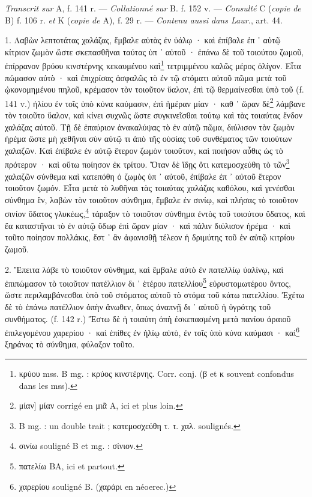 \documentclass[a4paper, 11pt, oneside, polutonikogreek, french]{article}
\begin{document}
\emph{Transcrit sur} A, f. 141 r. --- \emph{Collationné sur} B. f. 152 v. --- \emph{Consulté} C (\emph{copie de} B) f. 106 r. \emph{et} K (\emph{copie de} A), f. 29 r. --- \emph{Contenu aussi dans Laur.}, art. 44.

\bigskip

1. Λαβὼν λεπτοτάτας χαλάζας, ἔμβαλε αὐτὰς ἐν ὑάλῳ · καὶ ἐπίβαλε ἐπ ᾽ αὐτῷ κίτριον ζωμὸν ὥστε σκεπασθῆναι ταύτας ὐπ ᾽ αὐτοῦ · ἐπάνω δὲ τοῦ τοιούτου ζωμοῦ, ἐπίρρανον βρύου κινστέρνης κεκαυμένου καὶ\footnote{κρύου mss. B mg. : κρύος κινστέρνης. Corr. conj. (β et κ souvent confondus dans les mss).} τετριμμένου καλῶς μέρος ὀλίγον. Εἶτα πώμασον αὐτὸ · καὶ ἐπιχρίσας ἀσφαλῶς τὸ ἐν τῷ στόματι αὐτοῦ πῶμα μετὰ τοῦ ᾠκονομημένου πηλοῦ, κρέμασον τὸν τοιοῦτον ὕαλον, ἐπὶ τῷ θερμαίνεσθαι ὑπὸ τοῦ (f. 141 v.) ἡλίου ἐν τοῖς ὑπὸ κύνα καύμασιν, ἐπὶ ἡμέραν μίαν · καθ ᾽ ὥραν δὲ\footnote{μίαν] μίαν corrigé en μιᾶ A, ici et plus loin.} λάμβανε τὸν τοιοῦτο ὕαλον, καὶ κίνει συχνῶς ὥστε συγκινεῖσθαι τούτῳ καὶ τὰς τοιαύτας ἔνδον χαλάζας αὐτοῦ. Τῇ δὲ ἐπαύριον ἀνακαλύψας τὸ ἐν αὐτῷ πῶμα, διύλισον τὸν ζωμὸν ἠρέμα ὥστε μὴ χεθῆναι σὺν αὐτῷ τι ἀπὸ τῆς οὐσίας τοῦ συνθέματος τῶν τοιούτων χαλαζῶν. Καὶ ἐπίβαλε ἐν αὐτῷ ἕτερον ζωμὸν τοιοῦτον, καὶ ποιήσον αὖθις ὡς τὸ πρότερον · καὶ οὕτω ποίησον ἐκ τρίτου. Ὅταν δὲ ἴδῃς ὅτι κατεμοσχεύθη τὸ τῶν\footnote{B mg. : un double trait ; κατεμοσχεύθη τ. τ. χαλ. soulignés.} χαλαζῶν σύνθεμα καὶ κατεπόθη ὁ ζωμὸς ὑπ ᾽ αὐτοῦ, ἐπίβαλε ἐπ ᾽ αὐτοῦ ἕτερον τοιοῦτον ζωμόν. Εἶτα μετὰ τὸ λυθῆναι τὰς τοιαύτας χαλάζας καθόλου, καὶ γενέσθαι σύνθημα ἓν, λαβὼν τὸν τοιοῦτον σύνθημα, ἔμβαλε ἐν σινίῳ, καὶ πλήσας τὸ τοιοῦτον σινίον ὕδατος γλυκέως,\footnote{σινίω souligné B et mg. : σίνιον.} τάραξον τὸ τοιοῦτον σύνθημα ἐντὸς τοῦ τοιούτου ὕδατος, καὶ ἔα καταστῆναι τὸ ἐν αὐτῷ ὕδωρ ἐπὶ ὥραν μίαν · καὶ πάλιν διύλισον ἠρέμα · καὶ τοῦτο ποίησον πολλάκις, ἔστ ᾽ ἂν ἀφανισθῇ τέλεον ἡ δριμύτης τοῦ ἐν αὐτῷ κιτρίου ζωμοῦ.

2. Ἔπειτα λάβε τὸ τοιοῦτον σύνθημα, καὶ ἔμβαλε αὐτὸ ἐν πατελλίῳ ὑαλίνῳ, καὶ ἐπιπώμασον τὸ τοιοῦτον πατέλλιον δι ᾽ ἑτέρου πατελλίου\footnote{πατελίω BA, ici et partout.} εὐρυστομωτέρου ὄντος, ὥστε περιλαμβάνεσθαι ὑπὸ τοῦ στόματος αὐτοῦ τὸ στόμα τοῦ κάτω πατελλίου. Ἐχέτω δὲ τὸ ἐπάνω πατέλλιον ὀπὴν ἄνωθεν, ὅπως ἀναπνῇ δι ᾽ αὐτοῦ ἡ ὑγρότης τοῦ συνθήματος. (f. 142 r.) Ἔστω δὲ ἡ τοιαύτη ὀπὴ ἐσκεπασμένη μετὰ πανίου ἀραιοῦ ἐπιλεγομένου χαρερίου · καὶ ἐπίθες ἐν ἡλίῳ αὐτὸ, ἐν τοῖς ὑπὸ κύνα καύμασι · καὶ\footnote{χαρερίου souligné B. (χαράρι en néoerec.)} ξηράνας τὸ σύνθημα, φύλαξον τοῦτο.
\end{document}
